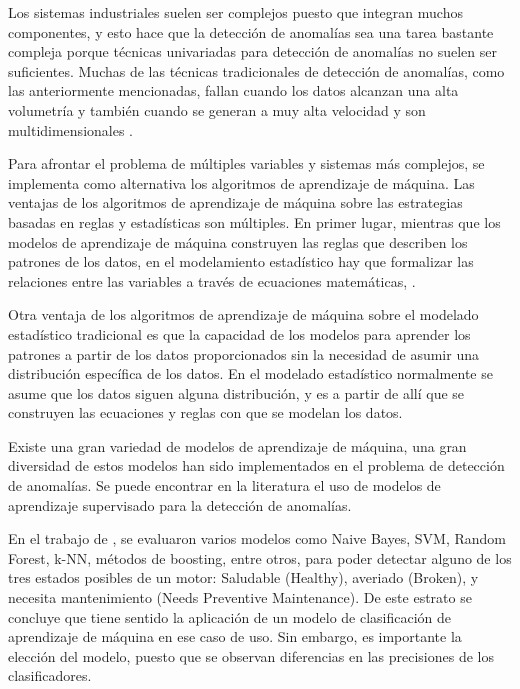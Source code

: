 \documentclass[11pt,a4paper,spanish]{book}
\numberwithin{equation}{chapter}
\numberwithin{figure}{chapter}
\begin{document}
Los sistemas industriales suelen ser complejos puesto que integran muchos componentes, y 
esto hace que la detección de anomalías sea una tarea bastante compleja porque técnicas 
univariadas para detección de anomalías no suelen ser suficientes. 
Muchas de las técnicas tradicionales de detección de anomalías, como las anteriormente 
mencionadas, fallan cuando los datos alcanzan una alta volumetría y también cuando se 
generan a muy alta velocidad y son multidimensionales \cite{thudumu2020survey}.


Para afrontar el problema de múltiples variables y sistemas más complejos, se implementa
como alternativa los algoritmos de aprendizaje de máquina. Las ventajas de los algoritmos
de aprendizaje de máquina sobre las estrategias basadas en reglas y estadísticas son múltiples.
En primer lugar, mientras que los modelos de aprendizaje de máquina construyen las reglas
que describen los patrones de los datos, en el modelamiento estadístico hay que formalizar
las relaciones entre las variables a través de ecuaciones matemáticas, \cite{ij2018statvsml}. 


Otra ventaja de los algoritmos de aprendizaje de máquina sobre el modelado estadístico
tradicional es que la capacidad de los modelos para aprender los patrones a partir de 
los datos proporcionados sin la necesidad de asumir una distribución específica de los datos.
En el modelado estadístico normalmente se asume que los datos siguen alguna distribución,
y es a partir de allí que se construyen las ecuaciones y reglas con que se modelan los datos. 


Existe una gran variedad de modelos de aprendizaje de máquina, una gran diversidad de 
estos modelos han sido implementados en el problema de detección de anomalías.
Se puede encontrar en la literatura el uso de modelos de aprendizaje supervisado para la
detección de anomalías. 


En el trabajo de \cite{baradaran2025predictivemaintenanceelectricmotors}, se  evaluaron 
varios modelos como Naive Bayes, SVM, Random Forest, k-NN, métodos de boosting, entre 
otros, para poder detectar alguno de los tres estados posibles de un motor: Saludable 
(Healthy), averiado (Broken), y necesita mantenimiento (Needs Preventive Maintenance).
De este estrato se concluye que tiene sentido la aplicación de un modelo de clasificación
de aprendizaje de máquina en ese caso de uso. Sin embargo, es importante la elección del
modelo, puesto que se observan diferencias en las precisiones de los clasificadores.   
\end{document}

